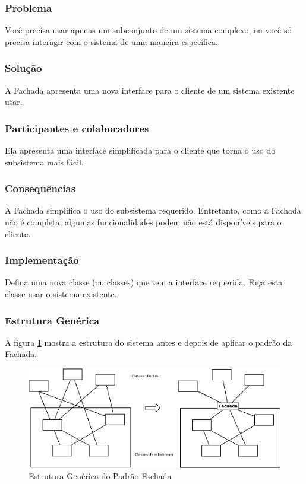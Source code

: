 \subsubsection{Problema}
Você precisa usar apenas um subconjunto de um sistema complexo, ou você só precisa interagir com o sistema de uma maneira específica.

\subsubsection{Solução}
A Fachada apresenta uma nova interface para o cliente de um sistema existente usar.

\subsubsection{Participantes e colaboradores}
Ela apresenta uma interface simplificada para o cliente que torna o uso do subsistema mais fácil.

\subsubsection{Consequências}
A Fachada simplifica o uso do subsistema requerido. Entretanto, como a Fachada não é completa, algumas funcionalidades podem não está disponíveis para o cliente.

\subsubsection{Implementação}
Defina uma nova classe (ou classes) que tem a interface requerida. Faça esta classe usar o sistema existente.

\subsubsection{Estrutura Genérica}
A figura \ref{fig:fachada} mostra a estrutura do sistema antes e depois de aplicar o padrão da Fachada.

\begin{figure}[h]
\begin{center}
\includegraphics[scale=0.42]{dp_fachada.png}
\caption{Estrutura Genérica do Padrão Fachada}\label{fig:fachada}
\end{center}
\end{figure}

